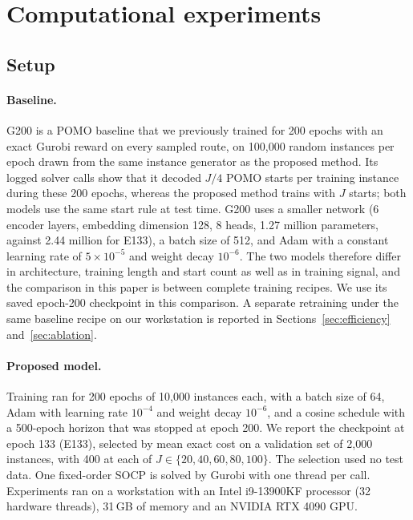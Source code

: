 \documentclass[preprint,12pt,authoryear]{elsarticle}
\begin{document}
\section{Computational experiments}
\label{sec:experiments}

\subsection{Setup}

\paragraph{Baseline.} G200 is a POMO baseline that we previously trained for 200 epochs with an exact Gurobi reward on every sampled route, on 100,000 random instances per epoch drawn from the same instance generator as the proposed method. Its logged solver calls show that it decoded $J/4$ POMO starts per training instance during these 200 epochs, whereas the proposed method trains with $J$ starts; both models use the same start rule at test time. G200 uses a smaller network (6 encoder layers, embedding dimension 128, 8 heads, 1.27 million parameters, against 2.44 million for E133), a batch size of 512, and Adam with a constant learning rate of $5 \times 10^{-5}$ and weight decay $10^{-6}$. The two models therefore differ in architecture, training length and start count as well as in training signal, and the comparison in this paper is between complete training recipes. We use its saved epoch-200 checkpoint in this comparison. A separate retraining under the same baseline recipe on our workstation is reported in Sections~\ref{sec:efficiency} and~\ref{sec:ablation}.

\paragraph{Proposed model.} Training ran for 200 epochs of 10,000 instances each, with a batch size of 64, Adam with learning rate $10^{-4}$ and weight decay $10^{-6}$, and a cosine schedule with a 500-epoch horizon that was stopped at epoch 200. We report the checkpoint at epoch 133 (E133), selected by mean exact cost on a validation set of 2,000 instances, with 400 at each of $J \in \{20,40,60,80,100\}$. The selection used no test data. One fixed-order SOCP is solved by Gurobi with one thread per call. Experiments ran on a workstation with an Intel i9-13900KF processor (32 hardware threads), 31\,GB of memory and an NVIDIA RTX 4090 GPU.
\end{document}
